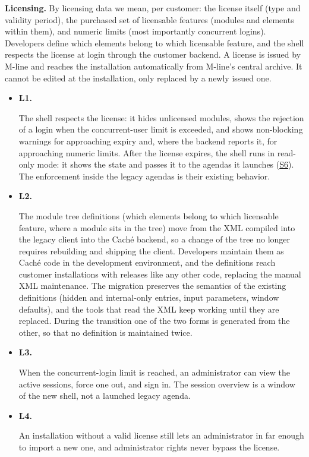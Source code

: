 \documentclass{article}
\newcommand{\reqdef}[1]{\hypertarget{req:#1}{\textbf{#1.}}}
\newcommand{\req}[1]{\hyperlink{req:#1}{#1}}
\begin{document}
\noindent \textbf{Licensing.} By licensing data we mean, per customer: the license itself (type and validity period), the purchased set of licensable features (modules and elements within them), and numeric limits (most importantly concurrent logins). Developers define which elements belong to which licensable feature, and the shell respects the license at login through the customer backend. A license is issued by M-line and reaches the installation automatically from M-line's central archive. It cannot be edited at the installation, only replaced by a newly issued one.
\begin{itemize}
  \item \reqdef{L1} The shell respects the license: it hides unlicensed modules, shows the rejection of a login when the concurrent-user limit is exceeded, and shows non-blocking warnings for approaching expiry and, where the backend reports it, for approaching numeric limits. After the license expires, the shell runs in read-only mode: it shows the state and passes it to the agendas it launches (\req{S6}). The enforcement inside the legacy agendas is their existing behavior.
  \item \reqdef{L2} The module tree definitions (which elements belong to which licensable feature, where a module sits in the tree) move from the XML compiled into the legacy client into the Caché backend, so a change of the tree no longer requires rebuilding and shipping the client. Developers maintain them as Caché code in the development environment, and the definitions reach customer installations with releases like any other code, replacing the manual XML maintenance. The migration preserves the semantics of the existing definitions (hidden and internal-only entries, input parameters, window defaults), and the tools that read the XML keep working until they are replaced. During the transition one of the two forms is generated from the other, so that no definition is maintained twice.
  \item \reqdef{L3} When the concurrent-login limit is reached, an administrator can view the active sessions, force one out, and sign in. The session overview is a window of the new shell, not a launched legacy agenda.
  \item \reqdef{L4} An installation without a valid license still lets an administrator in far enough to import a new one, and administrator rights never bypass the license.
\end{itemize}
\end{document}
